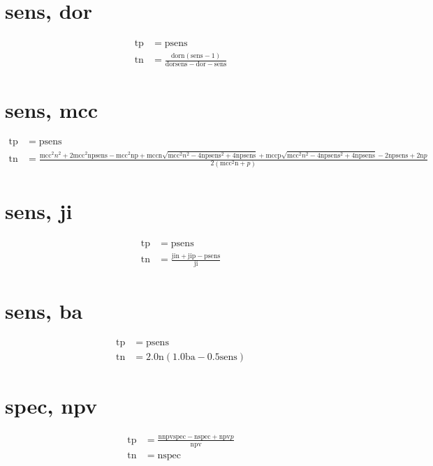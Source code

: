 \documentclass[3p,times]{elsarticle}
\begin{document}
\begin{footnotesize}
\begin{landscape}
\section{sens, dor}
\begin{align}
\mathrm{tp} &= \mathrm{p} \mathrm{sens}\\
\mathrm{tn} &= \frac{\mathrm{dor} \mathrm{n} \left(\mathrm{sens} - 1\right)}{\mathrm{dor} \mathrm{sens} - \mathrm{dor} - \mathrm{sens}}
\end{align}
\section{sens, mcc}
\begin{align}
\mathrm{tp} &= \mathrm{p} \mathrm{sens}\\
\mathrm{tn} &= \frac{\mathrm{mcc}^{2} n^{2} + 2 \mathrm{mcc}^{2} \mathrm{n} \mathrm{p} \mathrm{sens} - \mathrm{mcc}^{2} \mathrm{n} \mathrm{p} + \mathrm{mcc} \mathrm{n} \sqrt{\mathrm{mcc}^{2} n^{2} - 4 \mathrm{n} \mathrm{p} \mathrm{sens}^{2} + 4 \mathrm{n} \mathrm{p} \mathrm{sens}} + \mathrm{mcc} \mathrm{p} \sqrt{\mathrm{mcc}^{2} n^{2} - 4 \mathrm{n} \mathrm{p} \mathrm{sens}^{2} + 4 \mathrm{n} \mathrm{p} \mathrm{sens}} - 2 \mathrm{n} \mathrm{p} \mathrm{sens} + 2 \mathrm{n} p}{2 \left(\mathrm{mcc}^{2} \mathrm{n} + p\right)}
\end{align}
\section{sens, ji}
\begin{align}
\mathrm{tp} &= \mathrm{p} \mathrm{sens}\\
\mathrm{tn} &= \frac{\mathrm{ji} \mathrm{n} + \mathrm{ji} \mathrm{p} - \mathrm{p} \mathrm{sens}}{\mathrm{ji}}
\end{align}
\section{sens, ba}
\begin{align}
\mathrm{tp} &= \mathrm{p} \mathrm{sens}\\
\mathrm{tn} &= 2.0 \mathrm{n} \left(1.0 \mathrm{ba} - 0.5 \mathrm{sens}\right)
\end{align}
\section{spec, npv}
\begin{align}
\mathrm{tp} &= \frac{\mathrm{n} \mathrm{npv} \mathrm{spec} - \mathrm{n} \mathrm{spec} + \mathrm{npv} p}{\mathrm{npv}}\\
\mathrm{tn} &= \mathrm{n} \mathrm{spec}
\end{align}

\end{landscape}
\end{footnotesize}
\end{document}
